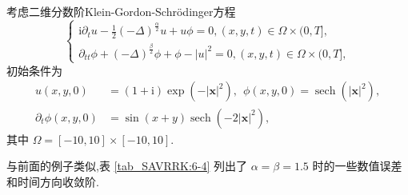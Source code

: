 \begin{example}\label{exp_SAVRRK:4}
\cite{fuStructurepreservingAlgorithmsTwodimensional2020} 
考虑二维分数阶Klein-Gordon-Schr{\"o}dinger方程
\begin{equation}
\begin{cases}
\mathrm{i} \partial_t u-\frac{1}{2}(-\Delta)^{\frac{\alpha}{2}} u+u \phi=0,(x, y, t) \in \Omega \times(0, T],\\
\partial_{t t} \phi+(-\Delta)^{\frac{\beta}{2}} \phi+\phi-|u|^2=0, (x, y, t) \in \Omega \times(0, T],
\end{cases}
\end{equation}
初始条件为
\begin{equation}
	\begin{aligned}
		u(x, y, 0)&=(1+\mathrm{i}) \exp \left(-|\boldsymbol{x}|^2\right),~~\phi(x, y, 0)=\operatorname{sech}\left(|\boldsymbol{x}|^2\right),\\
		\partial_t \phi(x, y, 0)&=\sin (x+y) \operatorname{sech}\left(-2|\boldsymbol{x}|^2\right),
	\end{aligned}
\end{equation}
其中 $\Omega=[-10,10] \times[-10,10]$.
\end{example}

与前面的例子类似,表 \ref{tab_SAVRRK:6-4} 列出了 $\alpha=\beta=1.5$ 时的一些数值误差和时间方向收敛阶.


